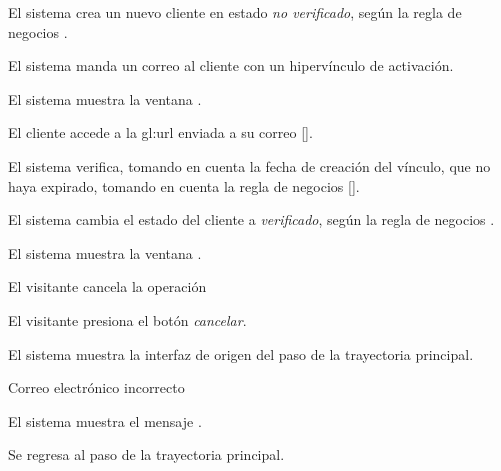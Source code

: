 {\begin{trayectoriaPrincipal}
    \item El sistema crea un nuevo cliente en estado \textit{no verificado},
      según la regla de negocios .

    \item El sistema manda un correo al cliente con un hipervínculo de
      activación.

    \item El sistema muestra la ventana
      .

    \item El cliente accede a la \gls{gl:url} enviada a su correo
      [].

    \item El sistema verifica, tomando en cuenta la fecha de creación del
      vínculo, que no haya expirado, tomando en cuenta la regla de negocios
      [].

    \item El sistema cambia el estado del cliente a \textit{verificado},
      según la regla de negocios .

    \item El sistema muestra la ventana
      .

  \end{trayectoriaPrincipal}

  \begin{trayectoriaAlternativa}[ta:cancelar]
    {El visitante cancela la operación}

    \item El visitante presiona el botón \textit{cancelar}.

    \item El sistema muestra la interfaz de origen del paso
       de la trayectoria principal.

  \end{trayectoriaAlternativa}

  \begin{trayectoriaAlternativa}
    {Correo electrónico incorrecto}

    \item El sistema muestra el mensaje .

    \item Se regresa al paso  de la trayectoria
      principal.


\end{trayectoriaAlternativa}}
